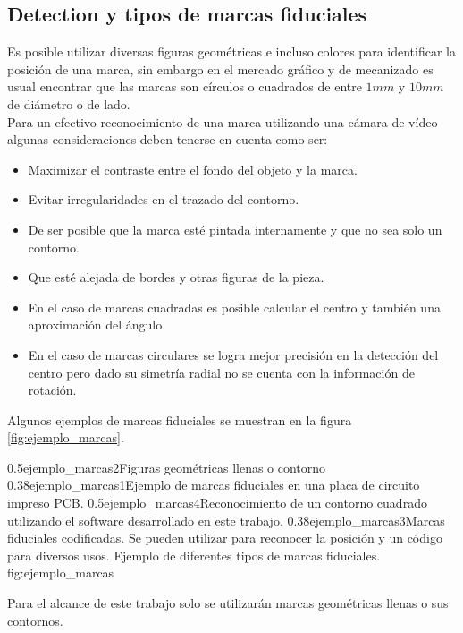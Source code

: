 \subsection{Detection y tipos de marcas fiduciales}
   Es posible utilizar diversas figuras geométricas e incluso colores para identificar la posición de una marca, sin embargo en el mercado gráfico y de mecanizado es usual encontrar que las marcas son círculos o cuadrados de entre $1mm$ y $10mm$ de diámetro o de lado.\\
   Para un efectivo reconocimiento de una marca utilizando una cámara de vídeo algunas consideraciones deben tenerse en cuenta como ser:
   \begin{itemize}
      \item{Maximizar el contraste entre el fondo del objeto y la marca.}
      \item{Evitar irregularidades en el trazado del contorno.}
      \item{De ser posible que la marca esté pintada internamente y que no sea solo un contorno.}
      \item{Que esté alejada de bordes y otras figuras de la pieza.}
      \item{En el caso de marcas cuadradas es posible calcular el centro y también una aproximación del ángulo.}
      \item{En el caso de marcas circulares se logra mejor precisión en la detección del centro pero dado su simetría radial no se cuenta con la información de rotación.}
   \end{itemize}
   Algunos ejemplos de marcas fiduciales se muestran en la figura \ref{fig:ejemplo_marcas}.

\subfigtwotwo
            {0.5}{ejemplo_marcas2}{Figuras geométricas llenas o contorno} 
            {0.38}{ejemplo_marcas1}{Ejemplo de marcas fiduciales en una placa de circuito impreso PCB.}
            {0.5}{ejemplo_marcas4}{Reconocimiento de un contorno cuadrado utilizando el software desarrollado en este trabajo.}
            {0.38}{ejemplo_marcas3}{Marcas fiduciales codificadas. Se pueden utilizar para reconocer la posición y un código para diversos usos.}
            {Ejemplo de diferentes tipos de marcas fiduciales.}
            {fig:ejemplo_marcas}

         Para el alcance de este trabajo solo se utilizarán marcas geométricas llenas o sus contornos.

